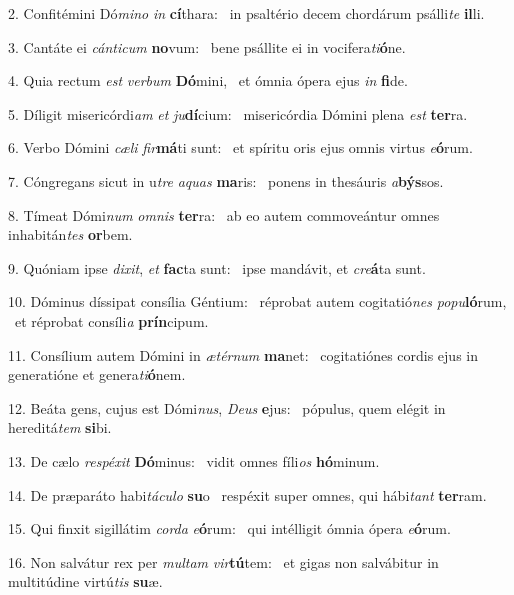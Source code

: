 2. Confitémini Dó\textit{mi}\textit{no} \textit{in} \textbf{cí}thara: \ast\  in psaltério decem chordárum psálli\textit{te} \textbf{il}li.\

3. Cantáte ei \textit{cán}\textit{ti}\textit{cum} \textbf{no}vum: \ast\  bene psállite ei in vocifera\textit{ti}\textbf{ó}ne.\

4. Quia rectum \textit{est} \textit{ver}\textit{bum} \textbf{Dó}mini, \ast\  et ómnia ópera ejus \textit{in} \textbf{fi}de.\

5. Díligit misericórdi\textit{am} \textit{et} \textit{ju}\textbf{dí}cium: \ast\  misericórdia Dómini plena \textit{est} \textbf{ter}ra.\

6. Verbo Dómini \textit{cæ}\textit{li} \textit{fir}\textbf{má}ti sunt: \ast\  et spíritu oris ejus omnis virtus \textit{e}\textbf{ó}rum.\

7. Cóngregans sicut in u\textit{tre} \textit{a}\textit{quas} \textbf{ma}ris: \ast\  ponens in thesáuris \textit{a}\textbf{býs}sos.\

8. Tímeat Dómi\textit{num} \textit{om}\textit{nis} \textbf{ter}ra: \ast\  ab eo autem commoveántur omnes inhabitán\textit{tes} \textbf{or}bem.\

9. Quóniam ipse \textit{di}\textit{xit}, \textit{et} \textbf{fac}ta sunt: \ast\  ipse mandávit, et \textit{cre}\textbf{á}ta sunt.\

10. Dóminus díssipat consília Géntium: \dag\  réprobat autem cogitatió\textit{nes} \textit{po}\textit{pu}\textbf{ló}rum, \ast\  et réprobat consíli\textit{a} \textbf{prín}cipum.\

11. Consílium autem Dómini in \textit{æ}\textit{tér}\textit{num} \textbf{ma}net: \ast\  cogitatiónes cordis ejus in generatióne et genera\textit{ti}\textbf{ó}nem.\

12. Beáta gens, cujus est Dómi\textit{nus}, \textit{De}\textit{us} \textbf{e}jus: \ast\  pópulus, quem elégit in hereditá\textit{tem} \textbf{si}bi.\

13. De cælo \textit{re}\textit{spé}\textit{xit} \textbf{Dó}minus: \ast\  vidit omnes fíli\textit{os} \textbf{hó}minum.\

14. De præparáto habi\textit{tá}\textit{cu}\textit{lo} \textbf{su}o \ast\  respéxit super omnes, qui hábi\textit{tant} \textbf{ter}ram.\

15. Qui finxit sigillátim \textit{cor}\textit{da} \textit{e}\textbf{ó}rum: \ast\  qui intélligit ómnia ópera \textit{e}\textbf{ó}rum.\

16. Non salvátur rex per \textit{mul}\textit{tam} \textit{vir}\textbf{tú}tem: \ast\  et gigas non salvábitur in multitúdine virtú\textit{tis} \textbf{su}æ.\

